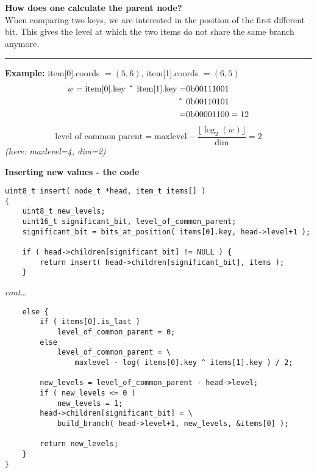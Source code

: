 \begin{frame}
    \textbf{How does one calculate the parent node?} \\
    When comparing two keys, we are interested in the position of the first
    different bit. This gives the level at which the two items do not share
    the same branch anymore.

    \noindent\rule{\textwidth}{1pt}

    \textbf{Example:} item[0].coords $= (5, 6)$, item[1].coords $= (6, 5)$ \\
    \begin{align}
        \begin{split}
            w = \textrm{item[0].key} \textrm{\textbf{ \^{} }} \textrm{item[1].key} =& 0\textrm{b}00111001 \\
            \textrm{\textbf{ \^{} }}& 0\textrm{b}00110101 \\
            =& 0\textrm{b}00001100 = 12
        \end{split}
    \end{align}
    \begin{equation}
        \textrm{level of common parent} =
        \textrm{maxlevel}-\frac{\lfloor \log_2\left(w\right)
        \rfloor}{\textrm{dim}} = 2
    \end{equation}
    {\small\textit{(here: maxlevel=4, dim=2)}}
\end{frame}

\begin{frame}[fragile]
    \textbf{Inserting new values - the code}
    \begin{verbatim}
uint8_t insert( node_t *head, item_t items[] )
{
    uint8_t new_levels;
    uint16_t significant_bit, level_of_common_parent;
    significant_bit = bits_at_position( items[0].key, head->level+1 );

    if ( head->children[significant_bit] != NULL ) {
        return insert( head->children[significant_bit], items );
    }
    \end{verbatim}
\end{frame}

\begin{frame}[fragile]
    \textit{cont\dots}
    \begin{verbatim}
    else {
        if ( items[0].is_last )
            level_of_common_parent = 0;
        else
            level_of_common_parent = \
                maxlevel - log( items[0].key ^ items[1].key ) / 2;

        new_levels = level_of_common_parent - head->level;
        if ( new_levels <= 0 )
            new_levels = 1;
        head->children[significant_bit] = \
            build_branch( head->level+1, new_levels, &items[0] );

        return new_levels;
    }
}
    \end{verbatim}
\end{frame}

